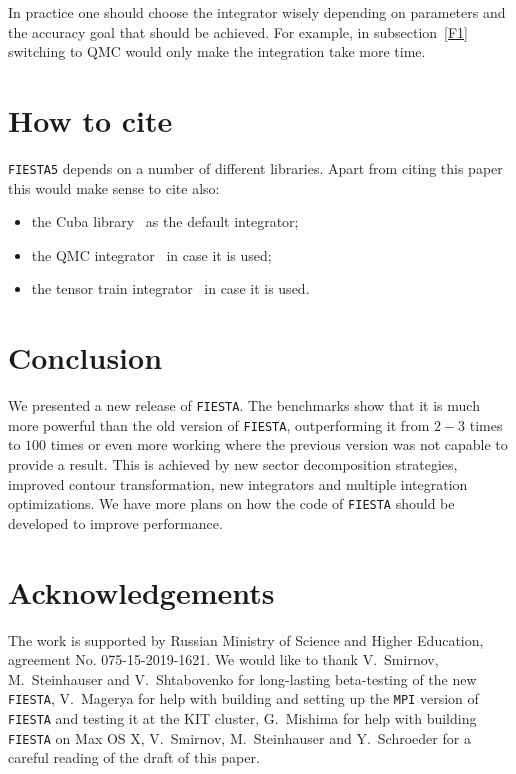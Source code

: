 \documentclass[preprint,12pt]{elsarticle}
\begin{document}
In practice one should choose the integrator wisely depending on parameters and the accuracy goal that should be achieved. For example, in subsection~\ref{F1} switching to QMC would only make the integration take more time.

\section*{How to cite}

{\tt FIESTA5} depends on a number of different libraries. Apart from citing this paper this would make sense to cite also:
\begin{itemize}
 \item the Cuba library~\cite{Hahn200578} as the default integrator;
 \item the QMC integrator~\cite{BOROWKA2019120} in case it is used;
 \item the tensor train integrator~\cite{Vysotsky2021} in case it is used.
\end{itemize}

\section*{Conclusion}

We presented a new release of {\tt FIESTA}. The benchmarks show that it is much more powerful than the old version of {\tt FIESTA}, outperforming it from $2-3$ times to $100$ times or even more working where the previous version was not capable to provide a result. This is achieved by new sector decomposition strategies, improved contour transformation, new integrators and multiple integration optimizations. We have more plans on how the code of {\tt FIESTA} should be developed to improve performance.

\section*{Acknowledgements}

The work is supported by Russian Ministry of Science and Higher Education, agreement No. 075-15-2019-1621. We would like to thank V.~Smirnov, M.~Steinhauser and V.~Shtabovenko for long-lasting beta-testing of the new {\tt FIESTA}, V.~Magerya for help with building and setting up the {\tt MPI} version of {\tt FIESTA} and testing it at the KIT cluster, G.~Mishima for help with building {\tt FIESTA} on Max OS X,  V.~Smirnov, M.~Steinhauser and Y.~Schroeder for a careful reading of the draft of this paper.



\end{document}
